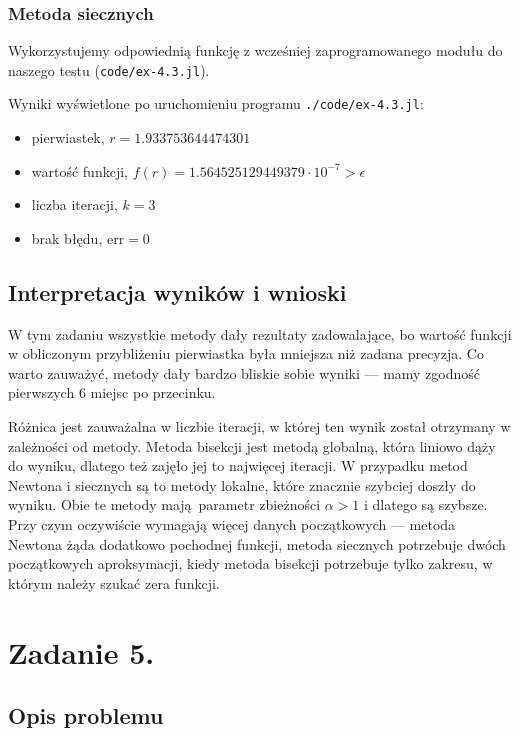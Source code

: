 \documentclass[10pt]{article}
\begin{document}
\subsubsection{Metoda siecznych}

Wykorzystujemy odpowiednią funkcję z wcześniej zaprogramowanego modułu do naszego testu (\texttt{code/ex-4.3.jl}).

\noindent Wyniki wyświetlone po uruchomieniu programu \texttt{./code/ex-4.3.jl}:
\begin{itemize}
    \item pierwiastek, $r = 1.933753644474301$
    \item wartość funkcji, $f(r) = 1.564525129449379 \cdot 10^{-7} > \epsilon$
    \item liczba iteracji, $k = 3$
    \item brak błędu, $\mathrm{err} = 0$
\end{itemize}

\subsection{Interpretacja wyników i wnioski}

W tym zadaniu wszystkie metody dały rezultaty zadowalające, bo wartość funkcji w obliczonym przybliżeniu pierwiastka była mniejsza niż zadana precyzja. Co warto zauważyć, metody dały bardzo bliskie sobie wyniki — mamy zgodność pierwszych 6 miejsc po przecinku.

Różnica jest zauważalna w liczbie iteracji, w której ten wynik został otrzymany w zależności od metody. Metoda bisekcji jest metodą globalną, która liniowo dąży do wyniku, dlatego też zajęło jej to najwięcej iteracji. W przypadku metod Newtona i siecznych są to metody lokalne, które znacznie szybciej doszły do wyniku. Obie te metody mają parametr zbieżności $\alpha > 1$ i dlatego są szybsze. Przy czym oczywiście wymagają więcej danych początkowych — metoda Newtona żąda dodatkowo pochodnej funkcji, metoda siecznych potrzebuje dwóch początkowych aproksymacji, kiedy metoda bisekcji potrzebuje tylko zakresu, w którym należy szukać zera funkcji.


\section{Zadanie 5.}

\subsection{Opis problemu}
\end{document}
